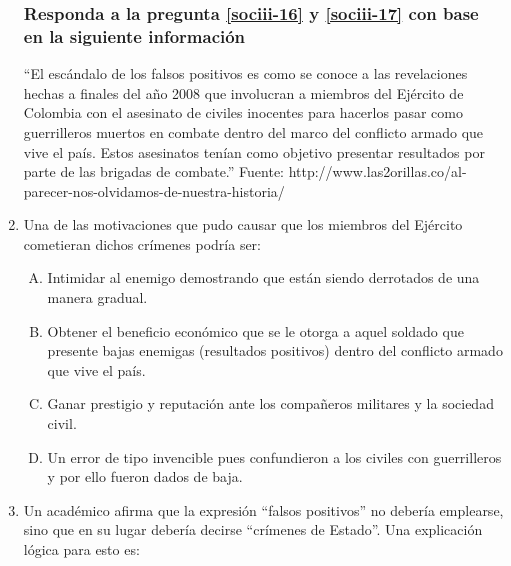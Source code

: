\begin{enumerate}

\subsubsection*{Responda a la pregunta \ref{sociii-16} y \ref{sociii-17} con base en la siguiente información}

``El escándalo de los falsos positivos es como se conoce a las revelaciones hechas a finales del año 2008 que involucran a miembros del Ejército de Colombia con el asesinato de civiles inocentes para hacerlos pasar como guerrilleros muertos en combate dentro del marco del conflicto armado que vive el país. Estos asesinatos tenían como objetivo presentar resultados por parte de las brigadas de combate.'' {\footnotesize Fuente: http://www.las2orillas.co/al-parecer-nos-olvidamos-de-nuestra-historia/}

\item Una de las motivaciones que pudo causar que los miembros del Ejército cometieran dichos crímenes podría ser:\label{sociii-16}


\begin{enumerate}[(A)]
\item   Intimidar al enemigo demostrando que están siendo derrotados de una manera gradual. 
 \item  Obtener el beneficio económico que se le otorga a aquel soldado que presente bajas enemigas (resultados positivos) dentro del conflicto armado que vive el país.
\item Ganar prestigio y reputación ante los compañeros militares y la sociedad civil.
\item Un error de tipo invencible pues confundieron a los civiles con guerrilleros y por ello fueron dados de baja.
\end{enumerate}



\item Un académico afirma que la expresión ``falsos positivos'' no debería emplearse, sino que en su lugar debería decirse ``crímenes de Estado''. Una explicación lógica para esto es:\label{sociii-17}



\end{enumerate}
